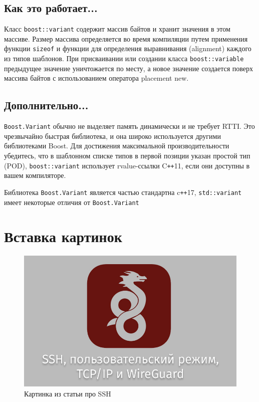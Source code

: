 \documentclass[a4paper, 12pt]{article} %
\begin{document}
\subsection*{Как это работает...}
Класс \texttt{boost::variant} содержит массив байтов и хранит значения в этом массиве. Размер массива определяется во время компиляции путем применения функции \texttt{sizeof} и функции для определения выравнивания (alignment) каждого из типов шаблонов. При присваивании или создании класса \texttt{boost::variable} предыдущее значение уничтожается по месту, а новое значение создается поверх массива байтов с использованием оператора placement new.

\subsection*{Дополнительно...}
\texttt{Boost.Variant} обычно не выделяет память динамически и не требует RTTI. Это чрезвычайно быстрая библиотека, и она широко используется другими библиотеками Boost. Для достижения максимальной производительности убедитесь, что в шаблонном списке типов в первой позиции указан простой тип (POD), \texttt{boost::variant} использует rvalue-ссылки C\texttt{++}11, если они доступны в вашем компиляторе.

Библиотека \texttt{Boost.Variant} является частью стандартна c\texttt{++}17, \texttt{std::variant} имеет некоторые отличия от \texttt{Boost.Variant}

\clearpage
\section*{Вставка картинок}

\begin{figure}[h!]
    \centering \includegraphics[scale=0.5]{img/1.jpeg}
    \caption{Картинка из статьи про SSH}
\end{figure}
\end{document}
